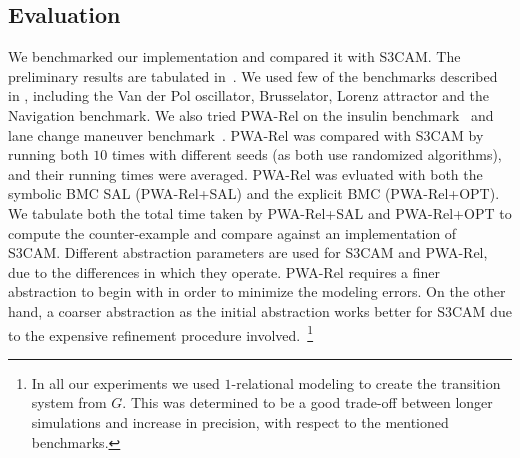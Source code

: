 

\subsection{Evaluation}

We benchmarked our implementation and compared it with S3CAM.  The
preliminary results are tabulated in~. We used few of
the benchmarks described in \cite{zutshi2014multiple}, including the
Van der Pol oscillator, Brusselator, Lorenz attractor and the
Navigation benchmark. We also tried PWA-Rel on the insulin
benchmark~\cite{chenformal} and lane change maneuver
benchmark~\cite{althoff2012reachability}. PWA-Rel was compared with
S3CAM by running both $10$ times with different seeds (as both use
randomized algorithms), and their running times were averaged. PWA-Rel
was evluated with both the symbolic BMC SAL (PWA-Rel+SAL) and the
explicit BMC (PWA-Rel+OPT). %
We
tabulate both the total time taken by PWA-Rel+SAL and PWA-Rel+OPT to
compute the counter-example and compare against an implementation of
S3CAM.  Different abstraction parameters are used for S3CAM and
PWA-Rel, due to the differences in which they operate. PWA-Rel
requires a finer abstraction to begin with in order to minimize the
modeling errors. On the other hand, a coarser abstraction as the
initial abstraction works better for S3CAM due to the expensive
refinement procedure involved.~\footnote{In all our experiments we
used $1$-relational modeling to create the transition system from $G$.
This was determined to be a good trade-off between longer simulations
and increase in precision, with respect to the mentioned benchmarks.}

